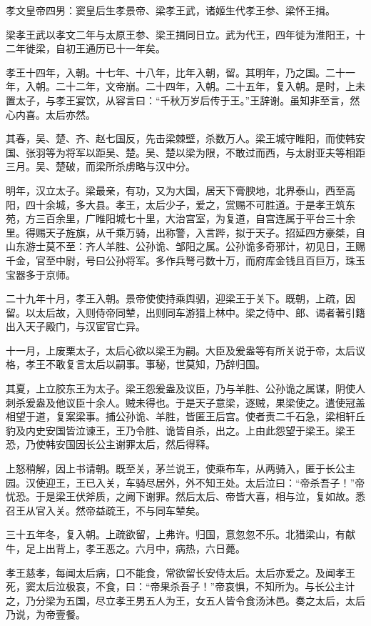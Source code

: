 \documentclass[]{article}
\begin{document}
孝文皇帝四男：窦皇后生孝景帝、梁孝王武，诸姬生代孝王参、梁怀王揖。

梁孝王武以孝文二年与太原王参、梁王揖同日立。武为代王，四年徙为淮阳王，十二年徙梁，自初王通历已十一年矣。

孝王十四年，入朝。十七年、十八年，比年入朝，留。其明年，乃之国。二十一年，入朝。二十二年，文帝崩。二十四年，入朝。二十五年，复入朝。是时，上未置太子，与孝王宴饮，从容言曰：``千秋万岁后传于王。''王辞谢。虽知非至言，然心内喜。太后亦然。

其春，吴、楚、齐、赵七国反，先击梁棘壁，杀数万人。梁王城守睢阳，而使韩安国、张羽等为将军以距吴、楚。吴、楚以梁为限，不敢过而西，与太尉亚夫等相距三月。吴、楚破，而梁所杀虏略与汉中分。

明年，汉立太子。梁最亲，有功，又为大国，居天下膏腴地，北界泰山，西至高阳，四十余城，多大县。孝王，太后少子，爱之，赏赐不可胜道。于是孝王筑东苑，方三百余里，广睢阳城七十里，大治宫室，为复道，自宫连属于平台三十余里。得赐天子旌旗，从千乘万骑，出称警，入言跸，拟于天子。招延四方豪桀，自山东游士莫不至：齐人羊胜、公孙诡、邹阳之属。公孙诡多奇邪计，初见日，王赐千金，官至中尉，号曰公孙将军。多作兵弩弓数十万，而府库金钱且百巨万，珠玉宝器多于京师。

二十九年十月，孝王入朝。景帝使使持乘舆驷，迎梁王于关下。既朝，上疏，因留。以太后故，入则侍帝同辇，出则同车游猎上林中。梁之侍中、郎、谒者著引籍出入天子殿门，与汉宦官亡异。

十一月，上废栗太子，太后心欲以梁王为嗣。大臣及爰盎等有所关说于帝，太后议格，孝王不敢复言太后以嗣事。事秘，世莫知，乃辞归国。

其夏，上立胶东王为太子。梁王怨爰盎及议臣，乃与羊胜、公孙诡之属谋，阴使人刺杀爰盎及他议臣十余人。贼未得也。于是天子意梁，逐贼，果梁使之。遣使冠盖相望于道，复案梁事。捕公孙诡、羊胜，皆匿王后宫。使者责二千石急，梁相轩丘豹及内史安国皆泣谏王，王乃令胜、诡皆自杀，出之。上由此怨望于梁王。梁王恐，乃使韩安国因长公主谢罪太后，然后得释。

上怒稍解，因上书请朝。既至关，茅兰说王，使乘布车，从两骑入，匿于长公主园。汉使迎王，王已入关，车骑尽居外，外不知王处。太后泣曰：``帝杀吾子！''帝忧恐。于是梁王伏斧质，之阙下谢罪。然后太后、帝皆大喜，相与泣，复如故。悉召王从官入关。然帝益疏王，不与同车辇矣。

三十五年冬，复入朝。上疏欲留，上弗许。归国，意忽忽不乐。北猎梁山，有献牛，足上出背上，孝王恶之。六月中，病热，六日薨。

孝王慈孝，每闻太后病，口不能食，常欲留长安侍太后。太后亦爱之。及闻孝王死，窦太后泣极哀，不食，曰：``帝果杀吾子！''帝哀惧，不知所为。与长公主计之，乃分梁为五国，尽立孝王男五人为王，女五人皆令食汤沐邑。奏之太后，太后乃说，为帝壹餐。
\end{document}
